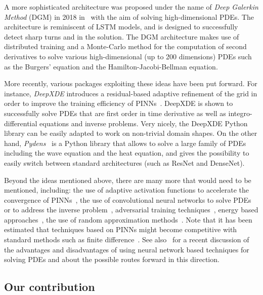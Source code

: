 \documentclass{article}
\begin{document}
A more sophisticated architecture was proposed under the name of \textit{Deep Galerkin Method} (DGM) in 2018 in~\cite{Sirignano_2018} with the aim of solving high-dimensional PDEs. The architecture is reminiscent of LSTM models, and is designed to successfully detect sharp turns and in the solution. The DGM architecture makes use of distributed training and a Monte-Carlo method for the computation of second derivatives to solve various high-dimensional (up to 200 dimensions) PDEs such as the Burgers' equation and the Hamilton-Jacobi-Bellman equation.

More recently, various packages exploiting these ideas have been put forward. For instance, \textit{DeepXDE} introduces a residual-based adaptive refinement of the grid in order to improve the training efficiency of PINNs~\cite{lu2020deepxde}. DeepXDE is shown to successfully solve PDEs that are first order in time derivative as well as integro-differential equations and inverse problems. Very nicely, the DeepXDE Python library can be easily adapted to work on non-trivial domain shapes. On the other hand, \textit{Pydens}~\cite{koryagin2019pydens} is a Python library that allows to solve a large family of PDEs including the wave equation and the heat equation, and gives the possibility to easily switch between standard architectures (such as ResNet and DenseNet).

Beyond the ideas mentioned above, there are many more that would need to be mentioned, including: the use of adaptive activation functions to accelerate the convergence of PINNs~\cite{jagtap2020adaptive, jagtap2020locally}, the use of convolutional neural networks to solve PDEs or to address the inverse problem~\cite{tompson2017accelerating, Geneva_2020, Thuerey_2020}, adversarial training techniques~\cite{Yang_2019}, energy based approaches~\cite{Samaniego_2020}, the use of random approximation methods~\cite{E_2017, chaudhari2017deep, Beck_2019, fujii2019asymptotic}. Note that it has been estimated that techniques based on PINNs might become competitive with standard methods such as finite difference~\cite{avrutskiy2020neural}. See also~\cite{dockhorn2019discussion} for a recent discussion of the advantages and disadvantages of using neural network based techniques for solving PDEs and about the possible routes forward in this direction.



\subsection{Our contribution}
\end{document}
